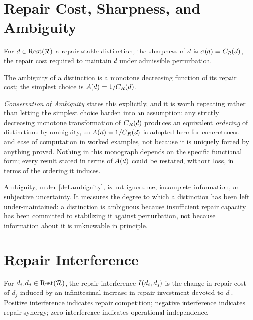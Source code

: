 \section{Repair Cost, Sharpness, and Ambiguity}


\begin{definition}
\label{def:sharpness}
For $d \in \mathrm{Rest}(\mathcal{R})$ a repair-stable distinction, the sharpness of $d$
is $\sigma(d) = C_R(d)$, the repair cost required to maintain $d$
under admissible perturbation.
\end{definition}

\begin{definition}
\label{def:ambiguity}
The ambiguity of a distinction is a monotone decreasing function of its
repair cost; the simplest choice is $A(d) = 1/C_R(d)$.
\end{definition}

\begin{remark}
\label{rem:ambiguity-convention}
\emph{Conservation of Ambiguity} states this explicitly, and it is worth
repeating rather than letting the simplest choice harden into an
assumption: any strictly decreasing monotone transformation of
$C_R(d)$ produces an equivalent \emph{ordering} of distinctions by
ambiguity, so $A(d) = 1/C_R(d)$ is adopted here for concreteness
and ease of computation in worked examples, not because it is uniquely
forced by anything proved. Nothing in this monograph depends on the
specific functional form; every result stated in terms of $A(d)$ could
be restated, without loss, in terms of the ordering it induces.
\end{remark}

Ambiguity, under \cref{def:ambiguity}, is not ignorance, incomplete
information, or subjective uncertainty. It measures the degree to which a
distinction has been left under-maintained: a distinction is ambiguous
because insufficient repair capacity has been committed to stabilizing it
against perturbation, not because information about it is unknowable in
principle.

\section{Repair Interference}

\begin{definition}
\label{def:interference}
For $d_i, d_j \in \mathrm{Rest}(\mathcal{R})$, the repair interference
$I(d_i,d_j)$ is the change in repair cost of $d_j$ induced by an
infinitesimal increase in repair investment devoted to $d_i$. Positive
interference indicates repair competition; negative interference
indicates repair synergy; zero interference indicates operational
independence.
\end{definition}

